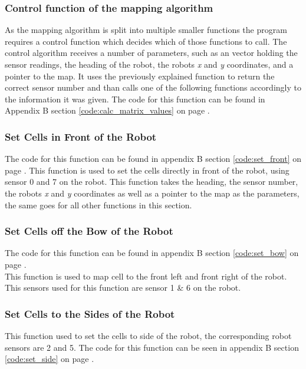 \subsubsection{Control function of the mapping algorithm}
\label{chap3:calc_matrix_value}
As the mapping algorithm is split into multiple smaller functions the program requires a control function which decides which of those functions to call. 
The control algorithm receives a number of parameters, such as an vector holding the sensor readings, the heading of the robot, the robots \textit{x} and \textit{y} coordinates, and a pointer to the map.
It uses the previously explained function to return the correct sensor number and than calls one of the following functions accordingly to the information it was given. 
The code for this function can be found in Appendix B section \ref{code:calc_matrix_values} on page \pageref{code:calc_matrix_values}.

\subsubsection{Set Cells in Front of the Robot}
\label{chap3:set_front}
The code for this function can be found in appendix B section \ref{code:set_front} on page \pageref{code:set_front}. 
This function is used to set the cells directly in front of the robot, using sensor 0 and 7 on the robot. This function takes the heading, the sensor number, the robots \textit{x} and \textit{y} coordinates as well as a pointer to the map as the parameters, the same goes for all other functions in this section. \\

\subsubsection{Set Cells off the Bow of the Robot}
The code for this function can be found in appendix B section \ref{code:set_bow} on page \pageref{code:set_bow}. \\
This function is used to map cell to the front left and front right of the robot. This sensors used for this function are sensor 1 \& 6 on the robot.  

\subsubsection{Set Cells to the Sides of the Robot}
This function used to set the cells to side of the robot, the corresponding robot sensors are 2 and 5. The code for this function can be seen in appendix B section \ref{code:set_side} on page \pageref{code:set_side}. 


